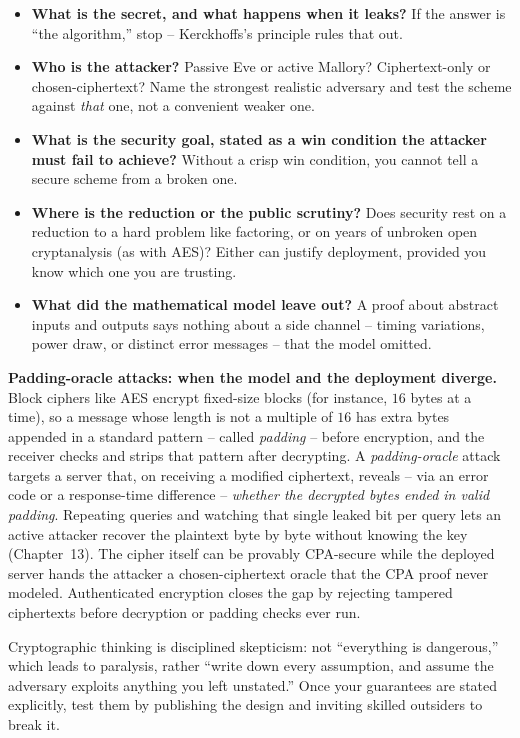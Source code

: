 \begin{itemize}
  \item \textbf{What is the secret, and what happens when it leaks?} If the answer is ``the algorithm,'' stop -- Kerckhoffs's principle rules that out.
  \item \textbf{Who is the attacker?} Passive Eve or active Mallory? Ciphertext-only or chosen-ciphertext? Name the strongest realistic adversary and test the scheme against \emph{that} one, not a convenient weaker one.
  \item \textbf{What is the security goal, stated as a win condition the attacker must fail to achieve?} Without a crisp win condition, you cannot tell a secure scheme from a broken one.
  \item \textbf{Where is the reduction or the public scrutiny?} Does security rest on a reduction to a hard problem like factoring, or on years of unbroken open cryptanalysis (as with AES)? Either can justify deployment, provided you know which one you are trusting.
  \item \textbf{What did the mathematical model leave out?} A proof about abstract inputs and outputs says nothing about a side channel -- timing variations, power draw, or distinct error messages -- that the model omitted.
\end{itemize}

\begin{attackbox}
\textbf{Padding-oracle attacks: when the model and the deployment diverge.} Block ciphers like AES encrypt fixed-size blocks (for instance, $16$ bytes at a time), so a message whose length is not a multiple of $16$ has extra bytes appended in a standard pattern -- called \emph{padding} -- before encryption, and the receiver checks and strips that pattern after decrypting. A \emph{padding-oracle} attack targets a server that, on receiving a modified ciphertext, reveals -- via an error code or a response-time difference -- \emph{whether the decrypted bytes ended in valid padding}. Repeating queries and watching that single leaked bit per query lets an active attacker recover the plaintext byte by byte without knowing the key (Chapter~13). The cipher itself can be provably CPA-secure while the deployed server hands the attacker a chosen-ciphertext oracle that the CPA proof never modeled. Authenticated encryption closes the gap by rejecting tampered ciphertexts before decryption or padding checks ever run.
\end{attackbox}

\begin{intuitionbox}
Cryptographic thinking is disciplined skepticism: not ``everything is dangerous,'' which leads to paralysis, rather ``write down every assumption, and assume the adversary exploits anything you left unstated.'' Once your guarantees are stated explicitly, test them by publishing the design and inviting skilled outsiders to break it.
\end{intuitionbox}

